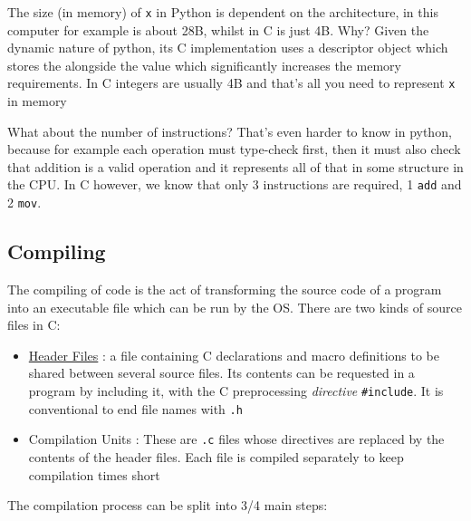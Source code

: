 
\par{The size (in memory) of \texttt{x} in Python is dependent on the architecture, in this computer for example is about 28B, whilst in C is just 4B. Why? Given the dynamic nature of python, its C implementation uses a descriptor object which stores the alongside the value which significantly increases the memory requirements. In C integers are usually 4B and that's all you need to represent \texttt{x} in memory }

\par{What about the number of instructions? That's even harder to know in python, because for example each operation must type-check first, then it must also check that addition is a valid operation and it represents all of that in some structure in the CPU. In C however, we know that only 3 instructions are required, 1 \texttt{add} and 2 \texttt{mov}.}


\subsection{Compiling}

\par{The compiling of code is the act of transforming the source code of a program into an executable file which can be run by the OS. There are two kinds of source files in C:}

\begin{itemize}
	\item \href{https://gcc.gnu.org/onlinedocs/cpp/Header-Files.html}{Header Files} : a file containing C declarations and macro definitions to be shared between several source files. Its contents can be requested in a program by including it, with the C preprocessing \textit{directive} \texttt{\#include}.  It is conventional to end file names with \texttt{.h}

	\item Compilation Units : These are \texttt{.c} files whose directives are replaced by the contents of the header files. Each file is compiled separately to keep compilation times short
\end{itemize}

\par{The compilation process can be split into 3/4 main steps:}


